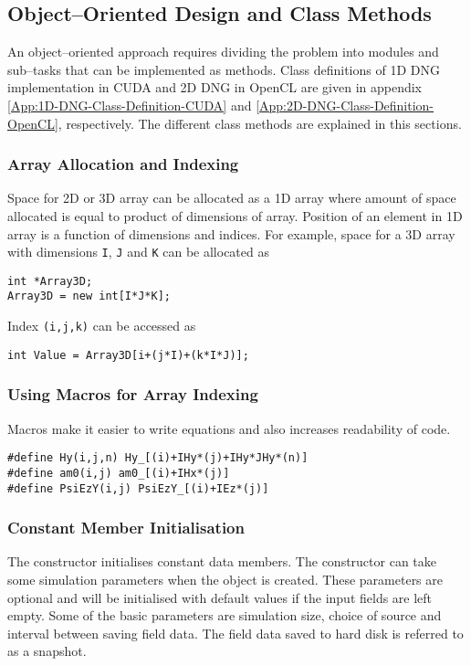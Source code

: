 \subsection{Object--Oriented Design and Class Methods}
An object--oriented approach requires dividing the problem into modules and sub--tasks that can be implemented as methods. Class definitions of 1D DNG implementation in CUDA and 2D DNG in OpenCL are given in appendix \ref{App:1D-DNG-Class-Definition-CUDA} and \ref{App:2D-DNG-Class-Definition-OpenCL}, respectively. The different class methods are explained in this sections.
\subsubsection{Array Allocation and Indexing}
Space for 2D or 3D array can be allocated as a 1D array where amount of space allocated is equal to product of dimensions of array. Position of an element in 1D array is a function of dimensions and indices. For example, space for a 3D array with dimensions \texttt{I}, \texttt{J} and \texttt{K} can be allocated as
\label{lst:3D-Array-Allocation}
\begin{lstlisting}[caption={3D array allocation}]
int *Array3D;
Array3D = new int[I*J*K];
\end{lstlisting}
Index \texttt{(i,j,k)} can be accessed as
\label{lst:3D-Array-Access}
\begin{lstlisting}[caption={Accessing elements of 3D array}]
int Value = Array3D[i+(j*I)+(k*I*J)];
\end{lstlisting}
\subsubsection{Using Macros for Array Indexing}
Macros make it easier to write equations and also increases readability of code.
\label{lst:Array-Access-Macro}
\begin{lstlisting}[caption={Macro to access array elements}]
#define Hy(i,j,n) Hy_[(i)+IHy*(j)+IHy*JHy*(n)]
#define am0(i,j) am0_[(i)+IHx*(j)]
#define PsiEzY(i,j) PsiEzY_[(i)+IEz*(j)]
\end{lstlisting}
\subsubsection{Constant Member Initialisation}
The constructor initialises constant data members. The constructor can take some simulation parameters when the object is created. These parameters are optional and will be initialised with default values if the input fields are left empty. Some of the  basic parameters are simulation size, choice of source and interval between saving field data. The field data saved to hard disk is referred to as a snapshot.
